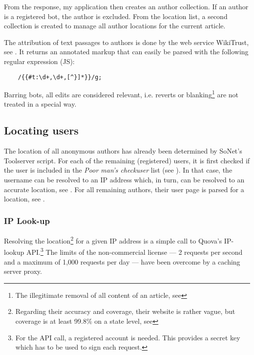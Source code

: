 From the response, my application then creates an author collection.
If an author is a registered bot, the author is excluded.
From the location list, a second collection is created to manage all author locations for the current article. 

The attribution of text passages to authors is done by the web service WikiTrust, see . 
It returns an annotated markup that can easily be parsed with the following regular expression (JS):

\lstset{caption=,label=wikitrustre,language=HTML,numbers=none}
\begin{lstlisting}
	/{{#t:\d+,\d+,[^}]*}}/g;
\end{lstlisting}

Barring bots, all edits are considered relevant, i.e. reverts or blanking\footnote{The illegitimate removal of all content of an article, see } are not treated in a special way.


\subsection{Locating users}\label{sub:locatingusers}

The location of all anonymous authors has already been determined by SoNet's Toolserver script.
For each of the remaining (registered) users, it is first checked if the user is included in the \emph{Poor man's checkuser} list (see ).
In that case, the username can be resolved to an \ac{IP} address which, in turn, can be resolved to an accurate location, see .
For all remaining authors, their user page is parsed for a location, see .


\subsubsection{IP Look-up}\label{sub:iplookup}

Resolving the location\footnote{Regarding their accuracy and coverage, their website is rather vague, but coverage is at least 99.8\% on a state level, see } for a given \ac{IP} address is a simple call to Quova's IP-lookup \ac{API}.\footnote{For the \ac{API} call, a registered account is needed. This provides a secret key which has to be used to sign each request.}
The limits of the non-commercial license --- 2 requests per second and a maximum of 1,000 requests per day --- have been overcome by a caching server proxy.


